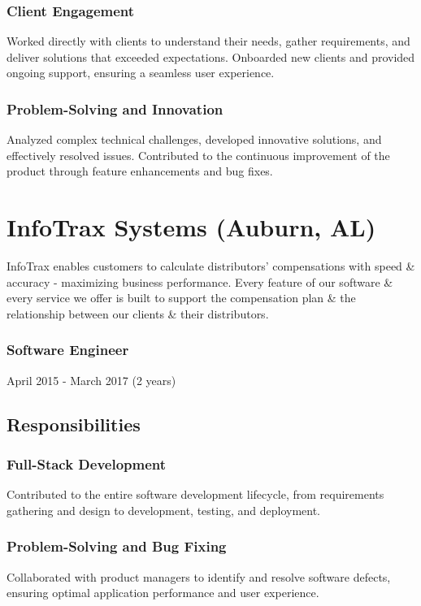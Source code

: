\documentclass[letterpaper,9pt]{article}
\begin{document}
	\subsubsection{Client Engagement}{Worked directly with clients to understand their needs, gather requirements, and deliver solutions that exceeded expectations. Onboarded new clients and provided ongoing support, ensuring a seamless user experience.}
	\subsubsection{Problem-Solving and Innovation}{Analyzed complex technical challenges, developed innovative solutions, and effectively resolved issues. Contributed to the continuous improvement of the product through feature enhancements and bug fixes.}
	
	\pagebreak


    \section{InfoTrax Systems (Auburn, AL)}{
    	InfoTrax enables customers to calculate distributors’ compensations with speed \& accuracy - maximizing business performance. Every feature of our software \& every service we offer is built to support the compensation plan \& the relationship between our clients \& their distributors.}
    \subsubsection{Software Engineer}{April 2015 - March 2017 (2 years)}
    \subsection{Responsibilities}
    \subsubsection{Full-Stack Development}{Contributed to the entire software development lifecycle, from requirements gathering and design to development, testing, and deployment.}
    \subsubsection{Problem-Solving and Bug Fixing}{Collaborated with product managers to identify and resolve software defects, ensuring optimal application performance and user experience.}
\end{document}
